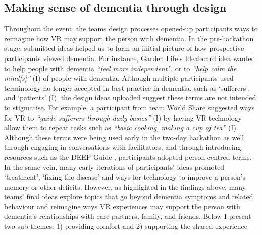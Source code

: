 \subsection{Making sense of dementia through design}
\label{ThemeThree:SenseofDementia}
Throughout the event, the teams design processes opened-up participants ways to reimagine how VR may support the person with dementia. In the pre-hackathon stage, submitted ideas helped us to form an initial picture of how prospective participants viewed dementia. For instance, Garden Life’s Ideaboard idea wanted to help people with dementia \textit{``feel more independent''}, or to \textit{``help calm the mind[s]''} (I) of people with dementia. Although multiple participants used terminology no longer accepted in best practice in dementia, such as `sufferers', and `patients' (I), the design ideas uploaded suggest these terms are not intended to stigmatise. For example, a participant from team World Share suggested ways for VR to \textit{``guide sufferers through daily basics''} (I) by having VR technology allow them to repeat tasks such as \textit{``basic cooking, making a cup of tea''} (I). Although these terms were being used early in the two-day hackathon as well, through engaging in conversations with facilitators, and through introducing resources such as the DEEP Guide \citep{diaries_deep_2020},  participants adopted person-centred terms. In the same vein, many early iterations of participants’ ideas promoted `treatment', `fixing the disease' and ways for technology to improve a person's memory or other deficits. However, as highlighted in the findings above, many teams’ final ideas explore topics that go beyond dementia symptoms and related behaviour and reimagine ways VR experiences may support the person with dementia’s relationships with care partners, family, and friends. Below I present two sub-themes: 1) providing comfort and 2) supporting the shared experience

